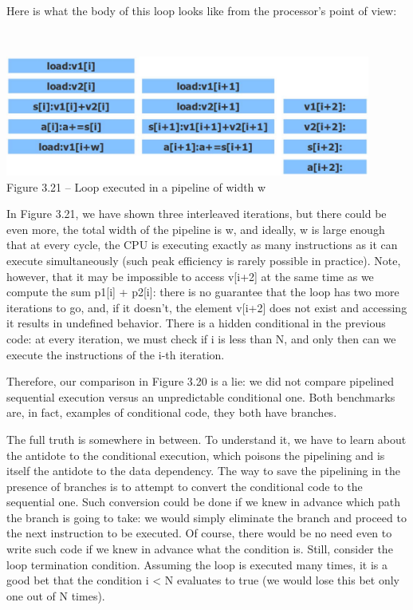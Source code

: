 Here is what the body of this loop looks like from the processor's point of view:

\hspace*{\fill} \\ %
\begin{center}
\includegraphics[width=0.9\textwidth]{content/1/chapter3/images/21.jpg}\\
Figure 3.21 – Loop executed in a pipeline of width w
\end{center}

In Figure 3.21, we have shown three interleaved iterations, but there could be even more, the total width of the pipeline is w, and ideally, w is large enough that at every cycle, the CPU is executing exactly as many instructions as it can execute simultaneously (such peak efficiency is rarely possible in practice). Note, however, that it may be impossible to access v[i+2] at the same time as we compute the sum p1[i] + p2[i]: there is no guarantee that the loop has two more iterations to go, and, if it doesn't, the element v[i+2] does not exist and accessing it results in undefined behavior. There is a hidden conditional in the previous code: at every iteration, we must check if i is less than N, and only then can we execute the instructions of the i-th iteration. 

Therefore, our comparison in Figure 3.20 is a lie: we did not compare pipelined sequential execution versus an unpredictable conditional one. Both benchmarks are, in fact, examples of conditional code, they both have branches.

The full truth is somewhere in between. To understand it, we have to learn about the antidote to the conditional execution, which poisons the pipelining and is itself the antidote to the data dependency. The way to save the pipelining in the presence of branches is to attempt to convert the conditional code to the sequential one. Such conversion could be done if we knew in advance which path the branch is going to take: we would simply eliminate the branch and proceed to the next instruction to be executed. Of course, there would be no need even to write such code if we knew in advance what the condition is. Still, consider the loop termination condition. Assuming the loop is executed many times, it is a good bet that the condition i < N evaluates to true (we would lose this bet only one out of N times).

